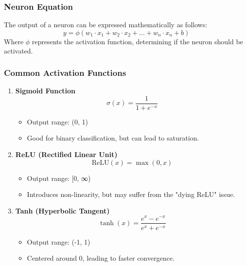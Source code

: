 \documentclass[aspectratio=169]{beamer}
\begin{document}
\begin{frame}[fragile]
  \frametitle{Neuron Equation}
  The output of a neuron can be expressed mathematically as follows:
  \begin{equation} 
  y = \phi(w_1 \cdot x_1 + w_2 \cdot x_2 + ... + w_n \cdot x_n + b) 
  \end{equation}
  Where \( \phi \) represents the activation function, determining if the neuron should be activated.
\end{frame}

\begin{frame}[fragile]
  \frametitle{Common Activation Functions}
  \begin{enumerate}
    \item \textbf{Sigmoid Function}
      \begin{equation} 
      \sigma(x) = \frac{1}{1 + e^{-x}} 
      \end{equation}
      \begin{itemize}
        \item Output range: (0, 1)
        \item Good for binary classification, but can lead to saturation.
      \end{itemize}

    \item \textbf{ReLU (Rectified Linear Unit)}
      \begin{equation} 
      \text{ReLU}(x) = \max(0, x) 
      \end{equation}
      \begin{itemize}
        \item Output range: [0, ∞)
        \item Introduces non-linearity, but may suffer from the "dying ReLU" issue.
      \end{itemize}
      
    \item \textbf{Tanh (Hyperbolic Tangent)}
      \begin{equation} 
      \tanh(x) = \frac{e^x - e^{-x}}{e^x + e^{-x}} 
      \end{equation}
      \begin{itemize}
        \item Output range: (-1, 1)
        \item Centered around 0, leading to faster convergence.
      \end{itemize}
  \end{enumerate}
\end{frame}
\end{document}
